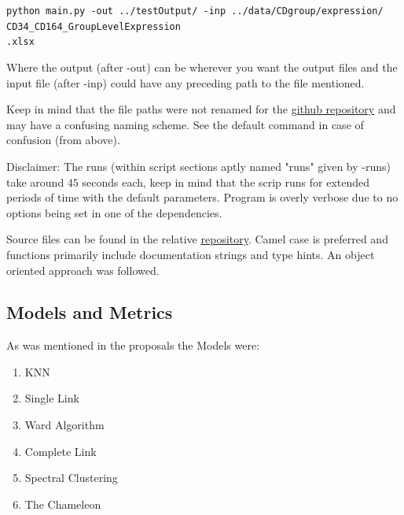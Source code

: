 \documentclass[12pt, a4paper]{article}
\begin{document}
\begin{multicols}{2}
                    \begin{minipage}{\linewidth}
                    \texttt{python main.py -out ../testOutput/ -inp ../data/CDgroup/expression/ \\ CD34\_CD164\_GroupLevelExpression \\ .xlsx}
                    \end{minipage}
                    \newline

                    Where the output (after -out) can be wherever you want the output files and the input file (after -inp) could have any preceding path to the file mentioned.
                    \newline

                    Keep in mind that the file paths were not renamed for the \href{https://github.com/ArisPodotas/MLICB-Project}{github repository} and may have a confusing naming scheme. See the default command in case of confusion (from above).
                    \newline

                    Disclaimer: The runs (within script sections aptly named "runs" given by -runs) take around $45$ seconds each, keep in mind that the scrip runs for extended periods of time with the default parameters. Program is overly verbose due to no options being set in one of the dependencies.
                    \newline

                    Source files can be found in the relative \href{https://github.com/ArisPodotas/MLICB-Project}{repository}. Camel case is preferred and functions primarily include documentation strings and type hints. An object oriented approach was followed.


            \subsection{Models and Metrics}\label{sub:Models and Metrics} %

                As was mentioned in the proposals the Models were:

                \begin{enumerate}
                    \item KNN
                    \item Single Link
                    \item Ward Algorithm
                    \item Complete Link
                    \item Spectral Clustering
                    \item The Chameleon
                \end{enumerate}


\end{multicols}
\end{document}
